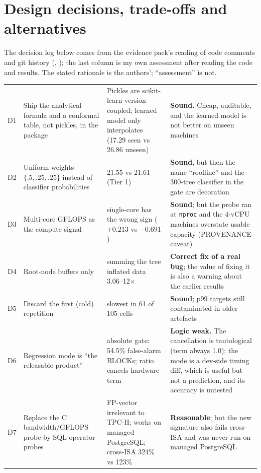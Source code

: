 \chapter{Design decisions, trade-offs and alternatives}\label{ch:decisions}

The decision log below comes from the evidence pack's reading of code comments and git history (\evPACK, ); the last column is my own assessment after reading the code and results. The stated rationale is the authors'; ``assessment'' is not.

\begin{center}\small
\begin{longtable}{@{}L{0.7cm}L{3.6cm}L{4.4cm}L{6.0cm}@{}}
\toprule {} &  &  & \\ \midrule \endhead
D1 & Ship the analytical formula and a conformal table, not pickles, in the package & Pickles are scikit-learn-version coupled; learned model only interpolates (17.29 seen vs 26.86 unseen) & \textbf{Sound.} Cheap, auditable, and the learned model is not better on unseen machines\\
D2 & Uniform weights $\{.5,.25,.25\}$ instead of classifier probabilities & 21.55 vs 21.61 (Tier 1) & \textbf{Sound}, but then the name ``roofline'' and the 300-tree classifier in the gate are decoration\\
D3 & Multi-core GFLOPS as the compute signal & single-core has the wrong sign ($+0.213$ vs $-0.691$) & \textbf{Sound}; but the probe ran at \texttt{nproc} and the 4-vCPU machines overstate usable capacity (PROVENANCE caveat)\\
D4 & Root-node buffers only & summing the tree inflated data 3.06--12$\times$ & \textbf{Correct fix of a real bug}; the value of fixing it is also a warning about the earlier results\\
D5 & Discard the first (cold) repetition & slowest in 61 of 105 cells & \textbf{Sound}; p99 targets still contaminated in older artefacts\\
D6 & Regression mode is ``the releasable product'' & absolute gate: 54.5\% false-alarm BLOCKs; ratio cancels hardware term & \textbf{Logic weak.} The cancellation is tautological (term always 1.0); the mode is a dev-side timing diff, which is useful but not a prediction, and its accuracy is untested\\
D7 & Replace the C bandwidth/GFLOPS probe by SQL operator probes & FP-vector irrelevant to TPC-H; works on managed PostgreSQL; cross-ISA 324\% vs 123\% & \textbf{Reasonable}; but the new signature also fails cross-ISA and was never run on managed PostgreSQL\\

\end{longtable}
\end{center}
